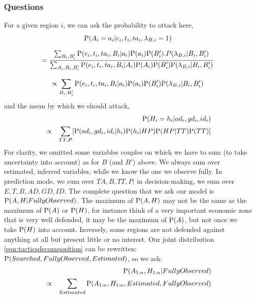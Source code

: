 \subsubsection{Questions}
For a given region $i$, we can ask the probability to attack here,
\begin{equation}
\mathrm{P}(A_i=a_i|e_i,t_i,ta_i,\lambda_{B,i}=1)
\end{equation}
\vspace{-0.2cm}
\begin{small}
\begin{equation}
= \frac{\sum_{B_i,B_i'}\mathrm{P}(e_i,t_i,ta_i,B_i|a_i)\mathrm{P}(a_i)\mathrm{P}(B_i').P(\lambda_{B,i}|B_i,B_i')}{\sum_{A_i,B_i,B_i'}\mathrm{P}(e_i,t_i,ta_i,B_i|A_i)\mathrm{P}(A_i)\mathrm{P}(B_i')\mathrm{P}(\lambda_{B,i}|B_i,B_i')}
\end{equation}
\end{small}
\vspace{-0.2cm}
\begin{equation}
\propto \sum_{B_i,B_i'}\mathrm{P}(e_i,t_i,ta_i,B_i|a_i)\mathrm{P}(a_i)\mathrm{P}(B_i')\mathrm{P}(\lambda_{B,i}|B_i,B_i')
\end{equation}
and the mean by which we should attack,
\begin{eqnarray}
& & \mathrm{P}(H_i=h_i|ad_i,gd_i,id_i) \\
& \propto & \sum_{TT,P}[\mathrm{P}(ad_i,gd_i,id_i|h_i)\mathrm{P}(h_i|HP)\mathrm{P}(HP|TT)\mathrm{P}(TT)]
\end{eqnarray}
For clarity, we omitted some variables couples on which we have to sum (to take uncertainty into account) as for $B$ (and $B'$) above. We always sum over estimated, inferred variables, while we know the one we observe fully. In prediction mode, we sum over $TA,B,TT,P$; in decision-making, we sum over $E,T,B,AD,GD,ID$. 
The complete question that we ask our model is $\mathrm{P}(A,H|FullyObserved)$. The maximum of $\mathrm{P}(A,H)$ may not be the same as the maximum of $\mathrm{P}(A)$ or $\mathrm{P}(H)$, for instance think of a very important economic zone that is very well defended, it may be the maximum of $\mathrm{P}(A)$, but not once we take $\mathrm{P}(H)$ into account. Inversely, some regions are not defended against anything at all but present little or no interest. Our joint distribution \ref{eqn:tacticsdecomposition} can be rewritten: $\mathrm{P}(Searched,FullyObserved,Estimated)$, so we ask:
\begin{eqnarray}
& & \mathrm{P}(A_{1:n},H_{1:n}|FullyObserved) \label{eqn:tacticsquestion}\\
& \propto & \sum_{Estimated}\mathrm{P}(A_{1:n},H_{1:n},Estimated,FullyObserved)
\end{eqnarray}


